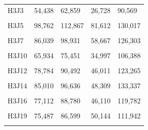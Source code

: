 \documentclass[
  a4paper,
  titlepage]{article}
\begin{document}
\begin{longtable}[t]{lllll}
H3J3 & 54,438 & 62,859 & 26,728 & 90,569\\
 
\cellcolor{gray!6}{H3J4} & \cellcolor{gray!6}{58,676} & \cellcolor{gray!6}{67,736} & \cellcolor{gray!6}{29,583} & \cellcolor{gray!6}{96,829}\\
 
H3J5 & 98,762 & 112,867 & 81,612 & 130,017\\
 
\cellcolor{gray!6}{H3J6} & \cellcolor{gray!6}{78,819} & \cellcolor{gray!6}{90,431} & \cellcolor{gray!6}{55,527} & \cellcolor{gray!6}{113,723}\\
 
H3J7 & 86,039 & 98,931 & 58,667 & 126,303\\
 
\cellcolor{gray!6}{H3J8} & \cellcolor{gray!6}{72,451} & \cellcolor{gray!6}{83,901} & \cellcolor{gray!6}{48,548} & \cellcolor{gray!6}{107,804}\\
 
H3J10 & 65,934 & 75,451 & 34,997 & 106,388\\
 
\cellcolor{gray!6}{H3J11} & \cellcolor{gray!6}{75,865} & \cellcolor{gray!6}{86,337} & \cellcolor{gray!6}{49,035} & \cellcolor{gray!6}{113,167}\\
 
H3J12 & 78,784 & 90,492 & 46,011 & 123,265\\
 
\cellcolor{gray!6}{H3J13} & \cellcolor{gray!6}{79,056} & \cellcolor{gray!6}{91,333} & \cellcolor{gray!6}{50,850} & \cellcolor{gray!6}{119,539}\\
 
H3J14 & 85,010 & 96,636 & 48,309 & 133,337\\
 
\cellcolor{gray!6}{H3J15} & \cellcolor{gray!6}{90,363} & \cellcolor{gray!6}{103,381} & \cellcolor{gray!6}{65,671} & \cellcolor{gray!6}{128,073}\\
 
H3J16 & 77,112 & 88,780 & 46,110 & 119,782\\
 
\cellcolor{gray!6}{H3J18} & \cellcolor{gray!6}{77,089} & \cellcolor{gray!6}{87,573} & \cellcolor{gray!6}{59,122} & \cellcolor{gray!6}{105,540}\\
 
H3J19 & 75,487 & 86,599 & 50,144 & 111,942\\
 
\cellcolor{gray!6}{H3J20} & \cellcolor{gray!6}{78,485} & \cellcolor{gray!6}{89,445} & \cellcolor{gray!6}{43,806} & \cellcolor{gray!6}{124,124}\\
 

\end{longtable}
\end{document}
